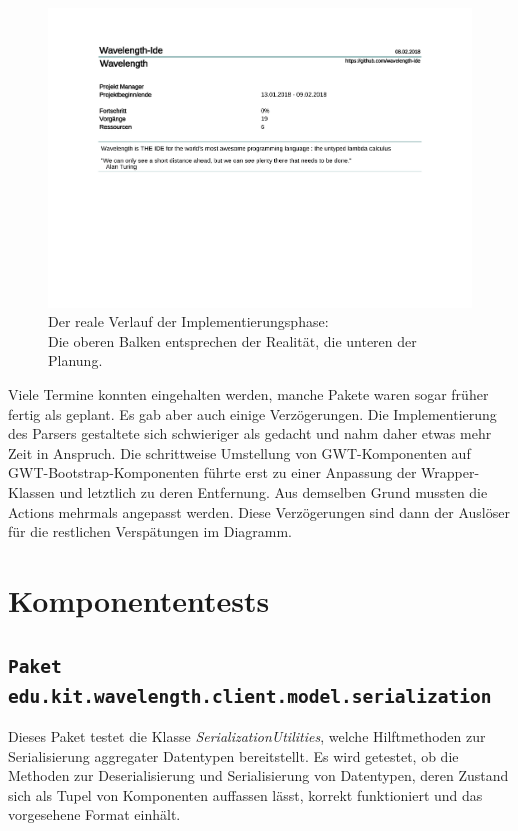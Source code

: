 \documentclass[parskip=full,11pt]{scrartcl}
\begin{document}
\begin{figure}[H]
\hspace*{-2cm}
\includegraphics[trim={0, 7cm, 0, 0}, clip, scale=0.65, page=4]{Implementierungsplan/Implementierungsplan.pdf}
\caption[caption]{Der reale Verlauf der Implementierungsphase: \\\hspace{\textwidth}
Die oberen Balken entsprechen der Realität, die unteren der Planung.}
\end{figure}

Viele Termine konnten eingehalten werden, manche Pakete waren sogar früher fertig als geplant.
Es gab aber auch einige Verzögerungen.
Die Implementierung des Parsers gestaltete sich schwieriger als gedacht und nahm daher etwas mehr Zeit in Anspruch.
Die schrittweise Umstellung von GWT-Komponenten auf GWT-Bootstrap-Komponenten führte erst zu einer Anpassung der
Wrapper-Klassen und letztlich zu deren Entfernung.
Aus demselben Grund mussten die Actions mehrmals angepasst werden.
Diese Verzögerungen sind dann der Auslöser für die restlichen Verspätungen im Diagramm.

\newpage
\section{Komponententests}
\subsection{\texttt{Paket edu.kit.wavelength.client.model.serialization}}
Dieses Paket testet die Klasse \emph{SerializationUtilities}, welche Hilftmethoden zur Serialisierung aggregater Datentypen
bereitstellt. Es wird getestet, ob die Methoden zur Deserialisierung und Serialisierung von Datentypen, deren Zustand sich als Tupel
von Komponenten auffassen lässt, korrekt funktioniert und das vorgesehene Format einhält.
\end{document}
